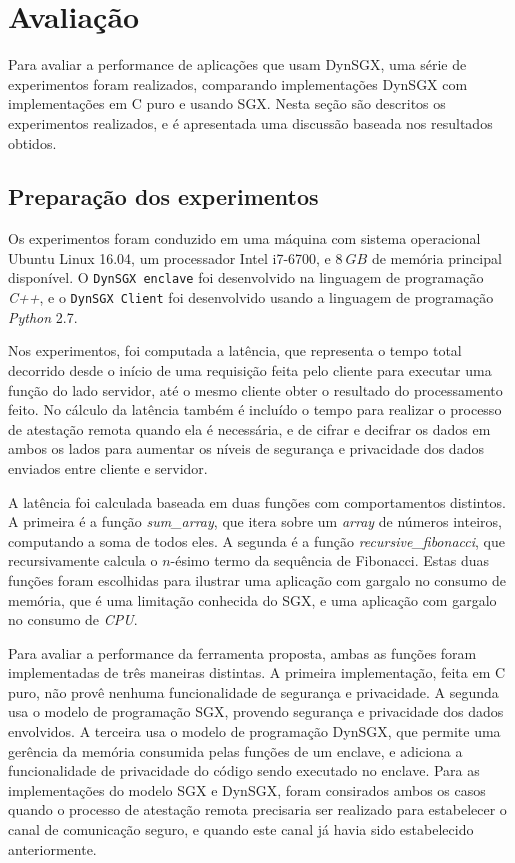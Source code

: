\section{Avaliação}
\label{sec:dynsgx_avaliacao}

Para avaliar a performance de aplicações que usam DynSGX, uma série de
experimentos foram realizados, comparando implementações DynSGX com
implementações em C puro e usando SGX. Nesta seção são descritos os experimentos
realizados, e é apresentada uma discussão baseada nos resultados obtidos.

\subsection{Preparação dos experimentos}
\label{subsec:dynsgx_avaliacao_exp_setup}

Os experimentos foram conduzido em uma máquina com sistema operacional Ubuntu
Linux 16.04, um processador Intel i7-6700, e $8\ GB$ de memória principal
disponível. O \texttt{DynSGX enclave} foi desenvolvido na linguagem de
programação \textit{C++}, e o \texttt{DynSGX Client} foi desenvolvido usando a
linguagem de programação \textit{Python} 2.7.

Nos experimentos, foi computada a latência, que representa o tempo total
decorrido desde o início de uma requisição feita pelo cliente para executar uma
função do lado servidor, até o mesmo cliente obter o resultado do processamento
feito. No cálculo da latência também é incluído o tempo para realizar o processo
de atestação remota quando ela é necessária, e de cifrar e decifrar os dados em
ambos os lados para aumentar os níveis de segurança e privacidade dos dados
enviados entre cliente e servidor.

A latência foi calculada baseada em duas funções com comportamentos distintos.
A primeira é a função \textit{sum\_array}, que itera sobre um \textit{array} de
números inteiros, computando a soma de todos eles. A segunda é a função \textit
{recursive\_fibonacci}, que recursivamente calcula o $n$-ésimo termo da sequência
de Fibonacci. Estas duas funções foram escolhidas para ilustrar uma aplicação
com gargalo no consumo de memória, que é uma limitação conhecida do SGX, e uma
aplicação com gargalo no consumo de \textit{CPU}. 

Para avaliar a performance da ferramenta proposta, ambas as funções foram
implementadas de três maneiras distintas. A primeira implementação, feita em
C puro, não provê nenhuma funcionalidade de segurança e privacidade. A segunda
usa o modelo de programação SGX, provendo segurança e privacidade dos dados
envolvidos. A terceira usa o modelo de programação DynSGX, que permite uma
gerência da memória consumida pelas funções de um enclave, e adiciona a
funcionalidade de privacidade do código sendo executado no enclave. Para as
implementações do modelo SGX e DynSGX, foram consirados ambos os casos quando o
processo de atestação remota precisaria ser realizado para estabelecer o canal
de comunicação seguro, e quando este canal já havia sido estabelecido
anteriormente.

